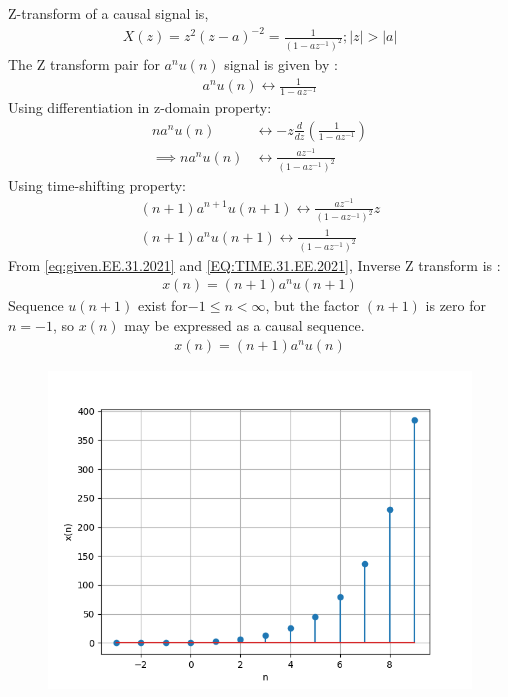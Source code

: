 \documentclass[journal,12pt,twocolumn]{IEEEtran}
\theoremstyle{remark}
\begin{document}
Z-transform of a causal signal is, 
\begin{align}
    X(z) = z^2(z - a)^{-2} = \frac{1}{(1 - az^{-1})^2};|z| > |a|\label{eq:given.EE.31.2021}
\end{align}
The Z transform pair for $a^nu(n)$ signal is given by :
\begin{align}
    a^nu(n) \longleftrightarrow \frac{1}{1 - az^{-1}}
\end{align}
Using differentiation in z-domain property:
\begin{align}
    na^nu(n) &\longleftrightarrow -z\frac{d}{dz}\left(\frac{1}{1 - az^{-1}}\right) \\
     \implies    na^nu(n) &\longleftrightarrow \frac{az^{-1}}{(1 - az^{-1})^2}
\end{align}
Using time-shifting property:
\begin{align}
  (n + 1)a^{n + 1}u(n + 1) \longleftrightarrow \frac{az^{-1}}{(1 - az^{-1})^2}z\\
  (n + 1)a^nu(n + 1) \longleftrightarrow \frac{1}{(1 - az^{-1})^2}\label{EQ:TIME.31.EE.2021}
\end{align}
From \eqref{eq:given.EE.31.2021} and \eqref{EQ:TIME.31.EE.2021}, Inverse Z transform is :
\begin{align}
    x(n) = (n + 1)a^nu(n + 1)
\end{align}
Sequence \(u(n + 1)\) exist for\(-1 \leq n < \infty\), but the factor \((n + 1)\) is zero for \(n = -1\), so \(x(n)\) may be expressed as a causal sequence. 
\begin{align}
    x(n) = (n + 1)a^nu(n)
\end{align}



\begin{figure}[htbp]
    \centering
    \includegraphics[width = \columnwidth]{figs/transform.png}
  \caption{}
    \label{fig:graph1.41.IN.2022}
\end{figure}

% 
\end{document}
